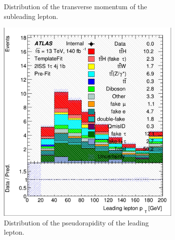 \begin{figure}[htb!]
\begin{subfigure}{0.45\textwidth}
        \caption{Distribution of the transverse momentum of the subleading lepton.}
        \label{fig:lep_pt_1}
    \end{subfigure}

    \vspace{0.5cm}

    \begin{subfigure}{0.45\textwidth}
        \includegraphics[width=\linewidth]{figures/plots/histograms/lep_Eta_0.png}
        \caption{Distribution of the pseudorapidity of the leading lepton.}
        \label{fig:lep_Eta_0}
    \end{subfigure}\hfill%
    \begin{subfigure}{0.45\textwidth}

\end{subfigure}
\end{figure}
